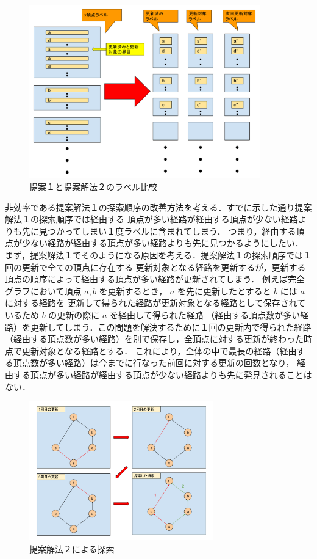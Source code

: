 \documentclass[12pt]{optlab-bachelor}
\begin{document}
\begin{figure}[htbp]
  \centering
  \caption{提案１と提案解法２のラベル比較}
  \includegraphics[width=10.0cm]{fig/fig8.pdf}
\end{figure}

非効率である提案解法１の探索順序の改善方法を考える．すでに示した通り提案解法１の探索順序では経由する
頂点が多い経路が経由する頂点が少ない経路よりも先に見つかってしまい１度ラベルに含まれてしまう．
つまり，経由する頂点が少ない経路が経由する頂点が多い経路よりも先に見つかるようにしたい．
まず，提案解法１でそのようになる原因を考える．提案解法１の探索順序では１回の更新で全ての頂点に存在する
更新対象となる経路を更新するが，更新する頂点の順序によって経由する頂点が多い経路が更新されてしまう．
例えば完全グラフにおいて頂点 $a,b$ を更新するとき， $a$ を先に更新したとすると $b$ には $a$ に対する経路を
更新して得られた経路が更新対象となる経路として保存されているため $b$ の更新の際に $a$ を経由して得られた経路
（経由する頂点数が多い経路）を更新してしまう．この問題を解決するために１回の更新内で得られた経路
（経由する頂点数が多い経路）を別で保存し，全頂点に対する更新が終わった時点で更新対象となる経路とする．
これにより，全体の中で最長の経路（経由する頂点数が多い経路）は今までに行なった前回に対する更新の回数となり，
経由する頂点が多い経路が経由する頂点が少ない経路よりも先に発見されることはない．

\begin{figure}[htbp]
  \centering
  \caption{提案解法２による探索}
  \includegraphics[height=6.0cm, width=8.0cm]{fig/fig7.pdf}
\end{figure}
\end{document}

